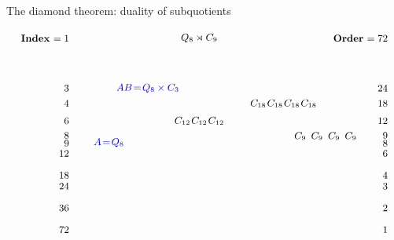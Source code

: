 \documentclass[8pt, handout]{beamer}
\begin{document}

\begin{frame}{The diamond theorem: duality of subquotients}

  \[
  \begin{tikzpicture}[shorten >= -2pt, shorten <= -2pt,xscale=1.1, scale=.7]
    \tikzstyle{every node}=[font=\small]
    \tikzstyle{B} = [thick]
    \begin{scope}[shift={(-7,0)}]
     \tikzstyle{every node}=[font=\small]
      \node[anchor=east] at (0,8.8) {\textbf{Index} $=1$};
      \node[anchor=east] at (0,6.5) {$3$};
      \node[anchor=east] at (0,5.8) {$4$};
      \node[anchor=east] at (0,5) {$6$};
      \node[anchor=east] at (0,4.33) {$8$};
      \node[anchor=east] at (0,3.97) {$9$};
      \node[anchor=east] at (0,3.5) {$12$};
      \node[anchor=east] at (0,2.5) {$18$};
      \node[anchor=east] at (0,2) {$24$};
      \node[anchor=east] at (0,1) {$36$};
      \node[anchor=east] at (0,0) {$72$};
   \end{scope}
   \begin{scope}[shift={(6.25,0)}]
     \tikzstyle{every node}=[font=\small]
      \node[anchor=east] at (0,8.8) {\textbf{Order} $=72$};
      \node[anchor=east] at (0,6.5) {$24$};
      \node[anchor=east] at (0,5.8) {$18$};
      \node[anchor=east] at (0,5) {$12$};
      \node[anchor=east] at (0,4.33) {$9$};
      \node[anchor=east] at (0,3.97) {$8$};
      \node[anchor=east] at (0,3.5) {$6$};
      \node[anchor=east] at (0,2.5) {$4$};
      \node[anchor=east] at (0,2) {$3$};
      \node[anchor=east] at (0,1) {$2$};
      \node[anchor=east] at (0,0) {$1$};
   \end{scope}
    \begin{scope}[shift={(0,0)}]
      \node (G) at (-1.75,8.8) {$Q_8\rtimes C_9$};
      \node[xBlue] (Q8xC3) at (-3.5,6.5) {\hspace{-6mm}$AB\!=\!Q_8\times C_3$};
      \node (C18-1) at (2.8,5.8) {$C_{18}$}; \node (C18-2) at (2.1,5.8) {$C_{18}$};
      \node (C18-3) at (1.4,5.8) {$C_{18}$}; \node (C18-4) at (.7,5.8) {$C_{18}$};
      \node (C12-1) at (-1.05,4.5+.5) {$C_{12}$}; \node (C12-2) at (-1.75,4.5+.5) {$C_{12}$};
      \node (C12-3) at (-2.45,4.5+.5) {$C_{12}$};
      \node (C9-1) at (4.55,4.3) {$C_9$}; \node (C9-2) at (3.85,4.3) {$C_9$};
      \node (C9-3) at (3.15,4.3) {$C_9$}; \node (C9-4) at (2.45,4.3) {$C_9$};
      \node[xBlue] (Q8) at (-5.25,4.5-.5) {\hspace{-4mm}$A\!=\!Q_8$};

\end{scope}
\end{tikzpicture}\]
\end{frame}
\end{document}
